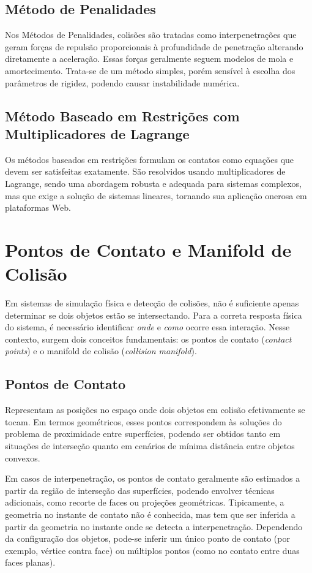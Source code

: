 \subsection*{Método de Penalidades}

Nos Métodos de Penalidades, colisões são tratadas como interpenetrações que geram forças de repulsão proporcionais à profundidade de penetração alterando diretamente a aceleração. Essas forças geralmente seguem modelos de mola e amortecimento. Trata-se de um método simples, porém sensível à escolha dos parâmetros de rigidez, podendo causar instabilidade numérica.

\subsection*{Método Baseado em Restrições com Multiplicadores de Lagrange}

Os métodos baseados em restrições formulam os contatos como equações que devem ser satisfeitas exatamente. São resolvidos usando multiplicadores de Lagrange, sendo uma abordagem robusta e adequada para sistemas complexos, mas que exige a solução de sistemas lineares, tornando sua aplicação onerosa em plataformas Web.

\section{Pontos de Contato e Manifold de Colisão}

Em sistemas de simulação física e detecção de colisões, não é suficiente apenas determinar se dois objetos estão  se intersectando. Para a correta resposta física do sistema, é necessário identificar \textit{onde} e \textit{como} ocorre essa interação. Nesse contexto, surgem dois conceitos fundamentais: os pontos de contato (\textit{contact points}) e o manifold de colisão (\textit{collision manifold}).

\subsection*{Pontos de Contato}

Representam as posições no espaço onde dois objetos em colisão efetivamente se tocam. Em termos geométricos, esses pontos correspondem às soluções do problema de proximidade entre superfícies, podendo ser obtidos tanto em situações de interseção quanto em cenários de mínima distância entre objetos convexos.

Em casos de interpenetração, os pontos de contato geralmente são estimados a partir da região de interseção das superfícies, podendo envolver técnicas adicionais, como recorte de faces ou projeções geométricas. Tipicamente, a geometria no instante de contato não é conhecida, mas tem que ser inferida a partir da geometria no instante onde se detecta a interpenetração. Dependendo da configuração dos objetos, pode-se inferir um único ponto de contato (por exemplo, vértice contra face) ou múltiplos pontos (como no contato entre duas faces planas).

